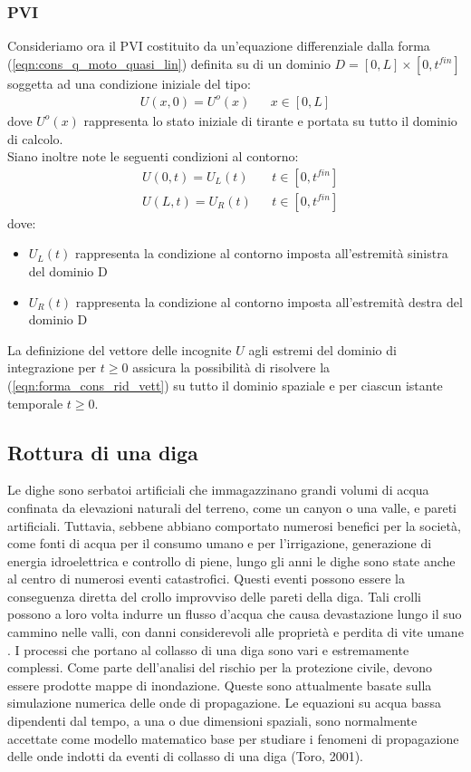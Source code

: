 \documentclass[12pt]{article} %
\begin{document}
\subsubsection{PVI}
\noindent Consideriamo ora il PVI costituito da un'equazione differenziale dalla forma (\ref{eqn:cons_q_moto_quasi_lin}) definita su di un dominio $D=[0,L]\times[0,t^{fin}]$ soggetta ad una condizione iniziale del tipo:
\begin{align}
    U(x,0) = U^o(x) && x \in [0,L]
\end{align}
\noindent dove $U^o(x)$ rappresenta lo stato iniziale di tirante e portata su tutto il dominio di calcolo.\\
\noindent Siano inoltre note le seguenti condizioni al contorno:
\begin{align}
    &U(0,t) = U_L(t) && t \in [0,t^{fin}]\\
    &U(L,t) = U_R(t) && t \in [0,t^{fin}]
\end{align}
\noindent dove:
\begin{itemize}
    \item $U_L(t)$ rappresenta la condizione al contorno imposta all'estremità sinistra del dominio D
    \item $U_R(t)$ rappresenta la condizione al contorno imposta all'estremità destra del dominio D
\end{itemize}
\noindent La definizione del vettore delle incognite $U$ agli estremi del dominio di integrazione per $t \geq 0$ assicura la possibilità di risolvere la (\ref{eqn:forma_cons_rid_vett}) su tutto il dominio spaziale e per ciascun istante temporale $t \geq 0$.

\subsection{Rottura di una diga}
\noindent Le dighe sono serbatoi artificiali che immagazzinano grandi volumi di acqua confinata da elevazioni naturali del terreno, come un canyon o una valle, e pareti artificiali. Tuttavia, sebbene abbiano comportato numerosi benefici per la società, come fonti di acqua per il consumo umano e per l'irrigazione, generazione di energia idroelettrica e controllo di piene, lungo gli anni le dighe sono state anche al centro di numerosi eventi catastrofici. Questi eventi possono essere la conseguenza diretta del crollo improvviso delle pareti della diga. Tali crolli possono a loro volta indurre un flusso d'acqua che causa devastazione lungo il suo cammino nelle valli, con danni considerevoli alle proprietà e perdita di vite umane . I processi che portano al collasso di una diga sono vari e estremamente complessi. Come parte dell'analisi del rischio per la protezione civile, devono essere prodotte mappe di inondazione. Queste sono attualmente basate sulla simulazione numerica delle onde di propagazione. Le equazioni su acqua bassa dipendenti dal tempo, a una o due dimensioni spaziali, sono normalmente accettate come modello matematico base per studiare i fenomeni di propagazione delle onde indotti da eventi di collasso di una diga (Toro, 2001).
\end{document}
